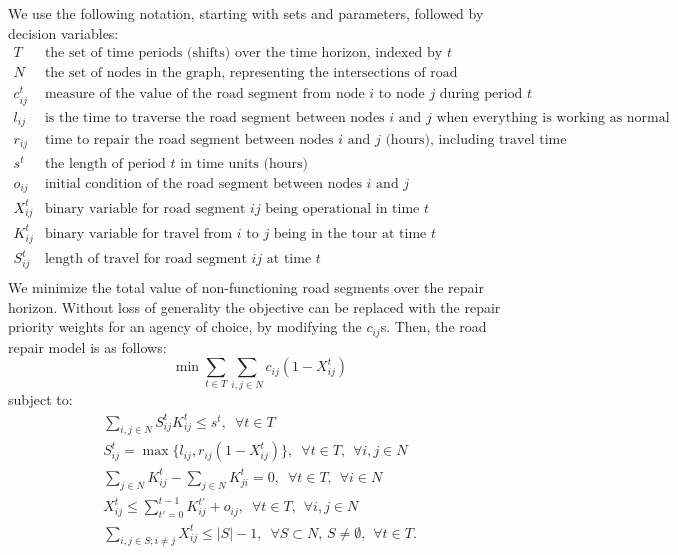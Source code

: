 \documentclass[10pt]{article}
\begin{document}
We use the following notation, starting with sets and parameters, followed by decision variables:
\small
\begin{displaymath}
\begin{array}{ll}
T & \mbox{the set of time periods (shifts) over the time horizon, indexed by $t$}\\
N & \mbox{the set of nodes in the graph, representing the intersections of road segments}\\
c_{ij}^t & \mbox{measure of the value of the road segment from node $i$ to node $j$ during period $t$}\\
l_{ij} & \mbox{is the time to traverse the road segment between nodes $i$ and $j$ when everything is working as normal}\\
r_{ij} & \mbox{time to repair the road segment between nodes $i$ and $j$ (hours), including travel time}\\
s^t & \mbox{the length of period $t$ in time units (hours)}\\
o_{ij} & \mbox{initial condition of the road segment between nodes $i$ and $j$}\\
X_{ij}^t & \mbox{binary variable for road segment $ij$ being operational in time $t$}\\
K_{ij}^t & \mbox{binary variable for travel from $i$ to $j$ being in the tour at time $t$}\\
S_{ij}^t & \mbox{length of travel for road segment $ij$ at time $t$}\\
\end{array}
\end{displaymath}
\normalsize
We minimize the total value of non-functioning road segments over the repair horizon. Without loss of generality the objective can be replaced with the repair priority weights for an agency of choice, by modifying the $c_{ij}$s. Then, the road repair model is as follows:
\begin{equation}
	\min \sum_{t \in T}  \sum_{i,j \in N} c_{ij}(1-X_{ij}^t) 
\end{equation}
subject to:
	\begin{eqnarray}
	\sum_{i,j \in N} S_{ij}^t K_{ij}^t \leq s^t, \hspace{6pt} \forall t\in T \\
	S_{ij}^t = \max \{l_{ij}, r_{ij}(1-X_{ij}^t) \}, \hspace{6pt} \forall t\in T, \hspace{5pt} \forall i,j \in N\\
	\sum_{j \in N} K_{ij}^t - \sum_{j \in N} K_{ji}^t = 0, \hspace{6pt} \forall t\in T, \hspace{5pt} \forall i \in N\\
	X_{ij}^t \le \sum_{t'=0}^{t-1} K_{ij}^{t'} + o_{ij} , \hspace{6pt} \forall t\in T,  \hspace{5pt} \forall i,j \in N\\
	\sum_{i,j \in S; i\neq j} X_{ij}^t \leq |S|-1, \hspace{6pt} \forall S \subset N, \hspace{2pt} S \neq \emptyset, \hspace{5pt} \forall t\in T.
	\end{eqnarray}
\end{document}
